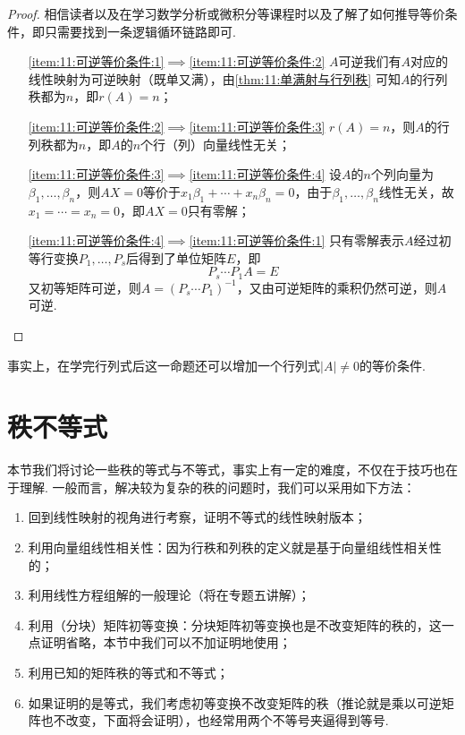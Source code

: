 \begin{proof}
    相信读者以及在学习数学分析或微积分等课程时以及了解了如何推导等价条件，即只需要找到一条逻辑循环链路即可.
    \begin{itemize}[leftmargin=.8in] %
        \item[\ref*{item:11:可逆等价条件:1}$\implies$\ref*{item:11:可逆等价条件:2}] $A$可逆我们有$A$对应的线性映射为可逆映射（既单又满），由\autoref{thm:11:单满射与行列秩} 可知$A$的行列秩都为$n$，即$r(A)=n$；

        \item[\ref*{item:11:可逆等价条件:2}$\implies$\ref*{item:11:可逆等价条件:3}] $r(A)=n$，则$A$的行列秩都为$n$，即$A$的$n$个行（列）向量线性无关；

        \item[\ref*{item:11:可逆等价条件:3}$\implies$\ref*{item:11:可逆等价条件:4}] 设$A$的$n$个列向量为$\beta_1,\ldots,\beta_n$，则$AX=0$等价于$x_1\beta_1+\cdots+x_n\beta_n=0$，由于$\beta_1,\ldots,\beta_n$线性无关，故$x_1=\cdots=x_n=0$，即$AX=0$只有零解；

        \item[\ref*{item:11:可逆等价条件:4}$\implies$\ref*{item:11:可逆等价条件:1}] 只有零解表示$A$经过初等行变换$P_1,\ldots,P_s$后得到了单位矩阵$E$，即
            \[P_s\cdots P_1A=E\]
            又初等矩阵可逆，则$A=(P_s\cdots P_1)^{-1}$，又由可逆矩阵的乘积仍然可逆，则$A$可逆.
    \end{itemize}
\end{proof}

事实上，在学完行列式后这一命题还可以增加一个行列式$|A|\neq 0$的等价条件.

\section{秩不等式}

本节我们将讨论一些秩的等式与不等式，事实上有一定的难度，不仅在于技巧也在于理解. 一般而言，解决较为复杂的秩的问题时，我们可以采用如下方法：
\begin{enumerate}
    \item 回到线性映射的视角进行考察，证明不等式的线性映射版本；

    \item 利用向量组线性相关性：因为行秩和列秩的定义就是基于向量组线性相关性的；

    \item 利用线性方程组解的一般理论（将在专题五讲解）；

    \item 利用（分块）矩阵初等变换：分块矩阵初等变换也是不改变矩阵的秩的，这一点证明省略，本节中我们可以不加证明地使用；

    \item 利用已知的矩阵秩的等式和不等式；

    \item 如果证明的是等式，我们考虑初等变换不改变矩阵的秩（推论就是乘以可逆矩阵也不改变，下面将会证明），也经常用两个不等号夹逼得到等号.
\end{enumerate}

